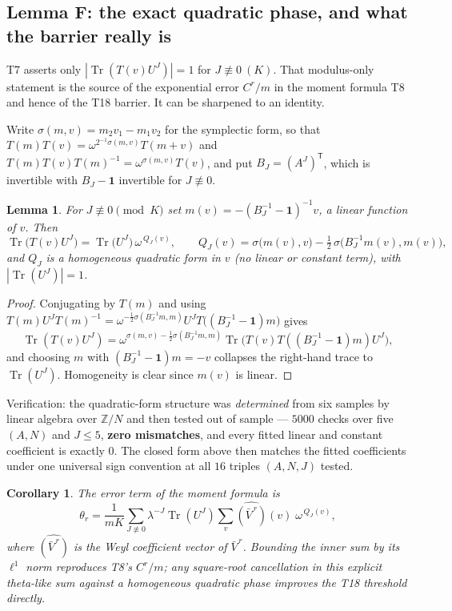 \documentclass[11pt,reqno]{amsart}
\newtheorem{lemma}[theorem]{Lemma}
\newtheorem{corollary}[theorem]{Corollary}
\theoremstyle{definition}
\DeclareMathOperator{\Tr}{Tr}
\newcommand{\ZZ}{\mathbb{Z}}
\begin{document}
\subsection{Lemma F: the exact quadratic phase, and what the barrier really is}
\label{sub:lemmaF}

T7 asserts only $|\Tr(T(v)U^J)|=1$ for $J\not\equiv0\ (K)$. That modulus-only
statement is the source of the exponential error $C^r/m$ in the moment formula T8
and hence of the T18 barrier. It can be sharpened to an identity.

Write $\sigma(m,v)=m_2v_1-m_1v_2$ for the symplectic form, so that
$T(m)T(v)=\omega^{2^{-1}\sigma(m,v)}T(m+v)$ and
$T(m)T(v)T(m)^{-1}=\omega^{\sigma(m,v)}T(v)$, and put $B_J=(A^J)^{\mathsf T}$,
which is invertible with $B_J-\mathbf1$ invertible for $J\not\equiv0$.

\begin{lemma}\label{lem:F}
For $J\not\equiv0\pmod K$ set $m(v)=-(B_J^{-1}-\mathbf1)^{-1}v$, a linear
function of $v$. Then
\[
  \Tr\bigl(T(v)U^J\bigr)=\Tr\bigl(U^J\bigr)\,\omega^{\,Q_J(v)},
  \qquad
  Q_J(v)=\sigma\bigl(m(v),v\bigr)-\tfrac12\,\sigma\bigl(B_J^{-1}m(v),m(v)\bigr),
\]
and $Q_J$ is a \emph{homogeneous} quadratic form in $v$ (no linear or constant
term), with $|\Tr(U^J)|=1$.
\end{lemma}

\begin{proof}
Conjugating by $T(m)$ and using
$T(m)U^JT(m)^{-1}=\omega^{-\frac12\sigma(B_J^{-1}m,m)}
 U^JT\bigl((B_J^{-1}-\mathbf1)m\bigr)$ gives
\[
  \Tr(T(v)U^J)=\omega^{\sigma(m,v)-\frac12\sigma(B_J^{-1}m,m)}
   \Tr\bigl(T(v)T((B_J^{-1}-\mathbf1)m)U^J\bigr),
\]
and choosing $m$ with $(B_J^{-1}-\mathbf1)m=-v$ collapses the right-hand trace to
$\Tr(U^J)$. Homogeneity is clear since $m(v)$ is linear.
\end{proof}

Verification: the quadratic-form structure was \emph{determined} from six samples
by linear algebra over $\ZZ/N$ and then tested out of sample --- $5000$ checks
over five $(A,N)$ and $J\le5$, \textbf{zero mismatches}, and every fitted linear
and constant coefficient is exactly $0$. The closed form above then matches the
fitted coefficients under one universal sign convention at all $16$ triples
$(A,N,J)$ tested.

\begin{corollary}\label{cor:barrier}
The error term of the moment formula is
\[
  \theta_r=\frac1{mK}\sum_{J\not\equiv0}\lambda^{-J}\Tr(U^J)
   \sum_{v}\widehat{(\bar V^{\,r})}(v)\;\omega^{\,Q_J(v)} ,
\]
where $\widehat{(\bar V^{\,r})}$ is the Weyl coefficient vector of $\bar V^{\,r}$.
Bounding the inner sum by its $\ell^1$ norm reproduces T8's $C^r/m$; any
square-root cancellation in this explicit \emph{theta-like} sum against a
homogeneous quadratic phase improves the T18 threshold directly.
\end{corollary}
\end{document}
